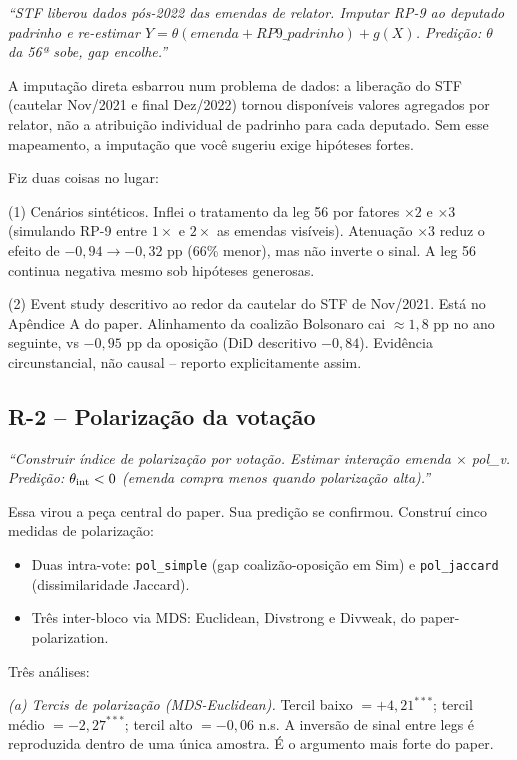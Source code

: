\documentclass[11pt,a4paper]{article}
\newcommand{\pedido}[1]{\par\medskip\noindent\textit{\textcolor{quotegray}{#1}}\par\smallskip}
\begin{document}
\pedido{``STF liberou dados pós-2022 das emendas de relator. Imputar RP-9 ao deputado padrinho e re-estimar $Y = \theta(emenda + RP9\_padrinho) + g(X)$. Predição: $\theta$ da 56ª sobe, gap encolhe.''}

A imputação direta esbarrou num problema de dados: a liberação do STF (cautelar Nov/2021 e final Dez/2022) tornou disponíveis valores agregados por relator, não a atribuição individual de padrinho para cada deputado. Sem esse mapeamento, a imputação que você sugeriu exige hipóteses fortes.

Fiz duas coisas no lugar:

(1) Cenários sintéticos. Inflei o tratamento da leg 56 por fatores $\times 2$ e $\times 3$ (simulando RP-9 entre $1\times$ e $2\times$ as emendas visíveis). Atenuação $\times 3$ reduz o efeito de $-0{,}94 \to -0{,}32$ pp (66\% menor), mas não inverte o sinal. A leg 56 continua negativa mesmo sob hipóteses generosas.

(2) Event study descritivo ao redor da cautelar do STF de Nov/2021. Está no Apêndice A do paper. Alinhamento da coalizão Bolsonaro cai $\approx 1{,}8$ pp no ano seguinte, vs $-0{,}95$ pp da oposição (DiD descritivo $-0{,}84$). Evidência circunstancial, não causal -- reporto explicitamente assim.

\subsection*{R-2 -- Polarização da votação}

\pedido{``Construir índice de polarização por votação. Estimar interação emenda $\times$ pol\_v. Predição: $\theta_{\rm int} < 0$ (emenda compra menos quando polarização alta).''}

Essa virou a peça central do paper. Sua predição se confirmou. Construí cinco medidas de polarização:
\begin{itemize}[leftmargin=*,itemsep=1pt]
\item Duas intra-vote: \texttt{pol\_simple} (gap coalizão-oposição em Sim) e \texttt{pol\_jaccard} (dissimilaridade Jaccard).
\item Três inter-bloco via MDS: Euclidean, Divstrong e Divweak, do paper-polarization.
\end{itemize}

Três análises:

\textit{(a) Tercis de polarização (MDS-Euclidean).} Tercil baixo $= +4{,}21^{***}$; tercil médio $= -2{,}27^{***}$; tercil alto $= -0{,}06$ n.s. A inversão de sinal entre legs é reproduzida dentro de uma única amostra. É o argumento mais forte do paper.
\end{document}
